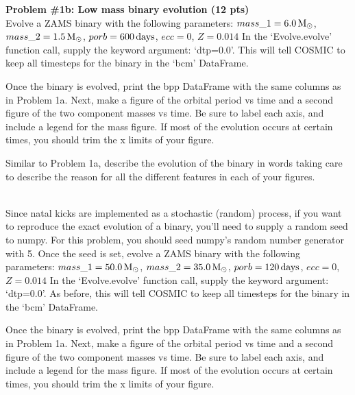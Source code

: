 \documentclass[11pt, a4paper]{article}
\newcommand\dunderline[3][-1pt]{{%
  \sbox0{#3}%
  \ooalign{\copy0\cr\rule[\dimexpr#1-#2\relax]{\wd0}{#2}}}}
\begin{document}
\noindent \textbf{Problem \#1b: Low mass binary evolution (12 pts)}\\
\noindent Evolve a ZAMS binary with the following parameters:\newline
$mass\_1=6.0\,\rm{M_{\odot}}$, $mass\_2=1.5\,\rm{M_{\odot}}$,
$porb=600\,\rm{days}$, $ecc=0$, $Z=0.014$\newline
In the `Evolve.evolve' function call, supply the keyword argument: `dtp=0.0'.
This will tell COSMIC to keep all timesteps for the binary in the `bcm'
DataFrame. 

\vspace{4pt}
\noindent Once the binary is evolved, print the bpp DataFrame with the same
columns as in Problem 1a. Next, make a figure of the orbital period vs time and
a second figure of the two component masses vs time. Be sure to label each axis,
and include a legend for the mass figure. If most of the evolution occurs at
certain times, you should trim the x limits of your figure.  

\vspace{4pt}
\noindent Similar to Problem 1a, describe the evolution of the binary in words
taking care to describe the reason for all the different features in each of
your figures. 

\vspace{10pt}
\noindent \dunderline{1.0pt}{\textbf{Problem \#1c: High mass binary evolution
(12 pts)}}\\
\noindent Since natal kicks are implemented as a stochastic (random) process, if
you want to reproduce the exact evolution of a binary, you'll need to supply a
random seed to numpy. For this problem, you should seed numpy's random number
generator with 5. Once the seed is set, evolve a ZAMS binary with the following
parameters:\newline
$mass\_1=50.0\,\rm{M_{\odot}}$, $mass\_2=35.0\,\rm{M_{\odot}}$,
$porb=120\,\rm{days}$, $ecc=0$, $Z=0.014$\newline
In the `Evolve.evolve' function call, supply the keyword argument: `dtp=0.0'. As
before, this will tell COSMIC to keep all timesteps for the binary in the `bcm'
DataFrame. 

\vspace{4pt}
\noindent Once the binary is evolved, print the bpp DataFrame with the same
columns as in Problem 1a. Next, make a figure of the orbital period vs time and
a second figure of the two component masses vs time. Be sure to label each axis,
and include a legend for the mass figure. If most of the evolution occurs at
certain times, you should trim the x limits of your figure.  
\end{document}

